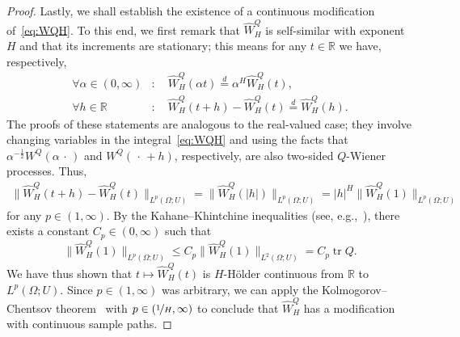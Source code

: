 \documentclass[reqno]{amsart}
\numberwithin{equation}{section}
\newcommand{\bbR}{\mathbb{R}}
\newcommand{\R}{\mathbb{R}}
\newcommand{\tr}{\operatorname{tr}}
\theoremstyle{remark}
\theoremstyle{definition}
\begin{document}
\begin{proof}
	Lastly, we shall establish the existence of a continuous modification of~\eqref{eq:WQH}. 
	To this end, we first remark that
	$\widehat W^Q_H$ is self-similar with exponent $H$ and that its increments are stationary;
	this means for any $t \in \R$ we have, respectively,
	\begin{align}
		\label{eq:self-similar}
		\forall \alpha \in (0,\infty) &: \quad 
		\widehat W^Q_H(\alpha t) \overset{d}{=} \alpha^H \widehat W^Q_H(t), \\
		\forall h \in \R &: \quad 
		\widehat W^Q_H(t + h) - \widehat W^Q_H(t) \overset{d}{=} \widehat W^Q_H(h).
		\label{eq:stat-incr}
	\end{align}
	The proofs of these statements are analogous to the real-valued case;
	they involve changing variables in the integral~\eqref{eq:WQH} and using the facts that
	$\alpha^{-\frac{1}{2}} W^Q(\alpha\,\cdot\,)$ and
	$W^Q(\,\cdot\, + h)$, respectively, are also two-sided $Q$-Wiener processes.
	Thus,
	\begin{equation}
		\begin{aligned}
			\bigl\| \widehat W^Q_H(t + h) - \widehat W^Q_H(t) \bigr\|_{L^p(\Omega; U)}
			=
			\bigl\| \widehat W^Q_H(|h|) \bigr\|_{L^p(\Omega; U)}
			=
			|h|^H \bigl\| \widehat W^Q_H(1) \bigr\|_{L^p(\Omega; U)}
		\end{aligned}
	\end{equation}
	for any $p \in (1,\infty)$.
	By the Kahane--Khintchine inequalities (see, e.g.,~\cite[Theorem~6.2.6]{HvNVWVolumeII}), 
	there exists a constant $C_p \in (0,\infty)$ such that
	\[
	\bigl\| \widehat W^Q_H(1) \bigr\|_{L^p(\Omega; U)} 
	\le 
	C_p \bigl\| \widehat W^Q_H(1) \bigr\|_{L^2(\Omega; U)} = C_p \tr Q.
	\]
	We have thus shown that $t \mapsto \widehat W^Q_H(t)$
	is $H$-H\"older continuous from $\bbR$ to $L^p(\Omega; U)$.
	Since $p \in (1,\infty)$ was arbitrary, we can apply 
	the Kolmogorov--Chentsov theorem~\cite[Corollary~3.10]{Cox2021local}
	with $p \in (\nicefrac{1}{H}, \infty)$ to conclude
	that $\widehat W^Q_H$ has a modification with continuous sample paths.
\end{proof}
\end{document}
